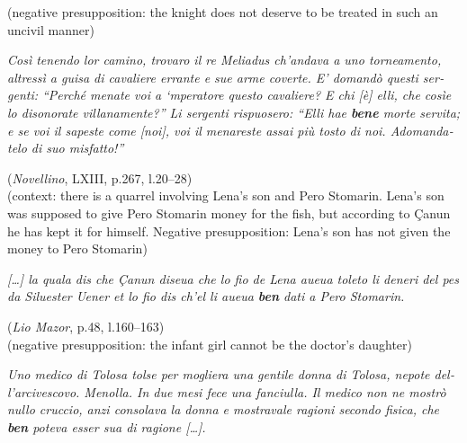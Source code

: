 \documentclass[output=paper]{langsci/langscibook}
\begin{document}
\ea\label{ex:key:12.7}
    \ea (negative presupposition: the knight does not deserve to be treated in
        such an uncivil manner)\\
        \begin{italian}\emph{Così tenendo lor camino, trovaro il re
        Meliadus ch’andava a uno torneamento, altressì a guisa di cavaliere errante
        e sue arme coverte. E’ domandò questi sergenti: “Perché menate voi a ‘mperatore
        questo cavaliere? E chi [è] elli, che cosìe lo disonorate villanamente?” Li
        sergenti rispuosero: “Elli hae \textbf{bene} morte servita; e se voi il sapeste
        come [noi], voi il menareste assai più tosto di noi. Adomandatelo di suo
        misfatto!”}\end{italian}\hfill(\emph{Novellino}, LXIII, p.267, l.20--28)\\
    \ex (context: there is a quarrel involving Lena’s son and Pero Stomarin.
        Lena’s son was supposed to give Pero Stomarin money for the fish, but
        according to Çanun he has kept it for himself. Negative presupposition:
        Lena’s son has not given the money to Pero Stomarin)\\
        \begin{italian}\emph{[\dots] la quala dis che Çanun diseua che lo fio de Lena aueua
        toleto li deneri del pes da Siluester Uener et lo fio dis ch’el li
        aueua \textbf{ben} dati a Pero Stomarin.}\end{italian}\hfill
        (\emph{Lio Mazor}, p.48, l.160--163)\\
    \ex (negative presupposition: the infant girl cannot be the doctor’s
        daughter)\\
        \begin{italian}\emph{Uno medico di Tolosa tolse per mogliera una gentile donna di
        Tolosa, nepote dell’arcivescovo. Menolla. In due mesi fece una
        fanciulla. Il medico non ne mostrò nullo cruccio, anzi consolava la
        donna e mostravale ragioni secondo fisica, che \textbf{ben} poteva
        esser sua di ragione [\dots{}].}\end{italian}\hfill
\end{document}
